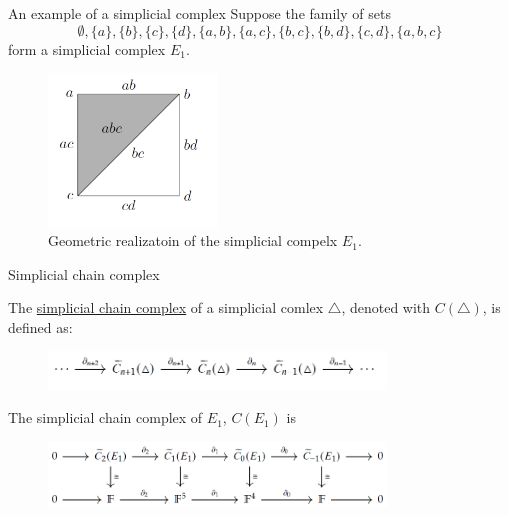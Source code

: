 \documentclass[xcolor={dvipsnames,svgnames}]{beamer}
\begin{document}
\begin{frame}{An example of a simplicial complex}
Suppose the family of sets 
    $$\emptyset, \{a\},\{b\},\{c\}, \{d\}, \{a,b\}, \{a,c\}, \{b,c\}, \{b,d\}, \{c,d\}, \{a,b,c\}$$ form a simplicial complex $E_1$.
\begin{figure}[H]
        \centering \includegraphics[width=0.4\textwidth]{figures/E1.png}
            \caption{Geometric realizatoin of the simplicial compelx $E_1$.}
    \end{figure}
\end{frame}


\begin{frame}{Simplicial chain complex}
\begin{defn}
The \underline{simplicial chain complex} of a simplicial comlex $\triangle$, denoted with $C(\triangle)$, is defined as:
\begin{figure}[H]
        \centering \includegraphics[width=0.8\textwidth]{figures/chain.png}
    \end{figure}
\end{defn}
The simplicial chain complex of $E_1$,  $C(E_1)$ is 
\begin{figure}[H]
        \centering \includegraphics[width=0.8\textwidth]{figures/chain_E1.png}
    \end{figure}
\end{frame}
\end{document}
